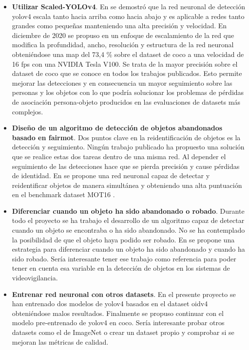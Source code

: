 \begin{itemize}
    \item \textbf{Utilizar Scaled-YOLOv4}. En \cite{bochkovskiy2020yolov4} se demostró que la red neuronal de detección \gls{yolov4} escala tanto hacia arriba como hacia abajo y es aplicable a redes tanto grandes como pequeñas manteniendo una alta precisión y velocidad. En diciembre de 2020 se propuso en \cite{wang2021scaledyolov4} un enfoque de escalamiento de la red que modifica la profundidad, ancho, resolución y estructura de la red neuronal obteniéndose una \gls{map} del 73,4 \% sobre el dataset de \gls{coco} a una velocidad de 16 \gls{fps} con una NVIDIA Tesla V100. Se trata de la mayor precisión sobre el dataset de \gls{coco} que se conoce en todos los trabajos publicados. Esto permite mejorar las detecciones y en consecuencia un mayor seguimiento sobre las personas y los objetos con lo que podría solucionar los problemas de pérdidas de asociación persona-objeto producidos en las evaluaciones de datasets más complejos.
    \item \textbf{Diseño de un algoritmo de detección de objetos abandonados basado en \gls{fairmot}}. Dos puntos clave en la reidentificación de objetos es la detección y seguimiento. Ningún trabajo publicado ha propuesto una solución que se realice estas dos tareas dentro de una misma red. Al depender el seguimiento de las detecciones hace que se pierda precisión y cause pérdidas de identidad. En \cite{zhang2020fair} se propone una red neuronal capaz de detectar y reidentificar objetos de manera simultánea y obteniendo una alta puntuación en el benchmark dataset MOT16 \cite{milan2016mot16}.
    \item \textbf{Diferenciar cuando un objeto ha sido abandonado o robado}. Durante todo el proyecto se ha trabajo el desarrollo de un algoritmo capaz de detectar cuando un objeto se encontraba o ha sido abandonado. No se ha contemplado la posibilidad de que el objeto haya podido ser robado. En \cite{9079525} se propone una estrategia para diferenciar cuando un objeto ha sido abandonado y cuando ha sido robado. Sería interesante tener ese trabajo como referencia para poder tener en cuenta esa variable en la detección de objetos en los sistemas de videovigilancia.
    \item \textbf{Entrenar red neuronal con otros datasets}. En el presente proyecto se han entrenado dos modelos de \gls{yolov4} basados en el dataset \gls{oidv4} obteniéndose malos resultados. Finalmente se propuso continuar con el modelo pre-entrenado de \gls{yolov4} en \gls{coco}. Sería interesante probar otros datasets como el de ImageNet \cite{russakovsky2015imagenet} o crear un dataset propio y comprobar si se mejoran las métricas de calidad.

\end{itemize}
